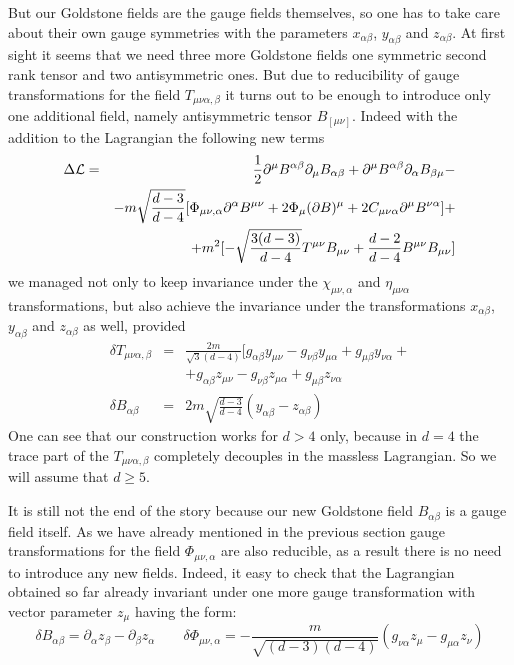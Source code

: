 \documentclass[a4paper,12pt]{article}
\begin{document}
But our Goldstone fields are the gauge fields themselves, so one has to
take care about their own gauge symmetries with the parameters
$x_{\alpha\beta}$, $y_{\alpha\beta}$ and $z_{\alpha\beta}$. At first
sight it seems that we need three more Goldstone fields one symmetric
second rank tensor and two antisymmetric ones. But due to reducibility
of gauge transformations for the field $T_{\mu\nu\alpha,\beta}$ it turns
out to be enough to introduce only one additional field, namely
antisymmetric tensor $B_{[\mu\nu]}$. Indeed with the addition to the
Lagrangian the following new terms
\begin{eqnarray}
\Delta {\cal L} &=& \frac{1}{2} \partial^\mu B^{\alpha\beta} \partial_\mu
B_{\alpha\beta} + \partial^\mu B^{\alpha\beta} \partial_\alpha B_{\beta\mu}
- \nonumber \\
 && - m \sqrt{\frac{d-3}{d-4}} [ \Phi_{\mu\nu,\alpha} \partial^\alpha
 B^{\mu\nu} + 2 \Phi_\mu (\partial B)^\mu + 2 C_{\mu\nu\alpha}
 \partial^\mu B^{\nu\alpha} ] + \nonumber \\
 && + m^2 [ - \sqrt{\frac{3(d-3)}{d-4}} T^{\mu\nu} B_{\mu\nu} +
 \frac{d-2}{d-4} B^{\mu\nu} B_{\mu\nu} ]
\end{eqnarray}
we managed not only to keep invariance under the $\chi_{\mu\nu,\alpha}$
and $\eta_{\mu\nu\alpha}$ transformations, but also achieve the invariance
under the transformations $x_{\alpha\beta}$, $y_{\alpha\beta}$ and
$z_{\alpha\beta}$ as well, provided
\begin{eqnarray}
\delta T_{\mu\nu\alpha,\beta} &=& \frac{2m}{\sqrt{3}(d-4)} [ g_{\alpha\beta}
y_{\mu\nu} - g_{\nu\beta} y_{\mu\alpha} + g_{\mu\beta} y_{\nu\alpha}
+ \nonumber \\
 && + g_{\alpha\beta} z_{\mu\nu} - g_{\nu\beta} z_{\mu\alpha} +
g_{\mu\beta} z_{\nu\alpha} \\
\delta B_{\alpha\beta} &=& 2 m \sqrt{\frac{d-3}{d-4}} (y_{\alpha\beta} -
z_{\alpha\beta}) \nonumber
\end{eqnarray}
One can see that our construction works for $d > 4$ only, because
in $d=4$ the trace part of the $T_{\mu\nu\alpha,\beta}$ completely
decouples in the massless Lagrangian. So we will assume that $d \ge 5$.

It is still not the end of the story because our new Goldstone field
$B_{\alpha\beta}$ is a gauge field itself. As we have already mentioned
in the previous section gauge transformations for the field
$\Phi_{\mu\nu,\alpha}$ are also reducible, as a result there is no need
to introduce any new fields. Indeed, it easy to check that the Lagrangian
obtained so far already invariant under one more gauge transformation
with vector parameter $z_\mu$ having the form:
\begin{equation}
\delta B_{\alpha\beta} = \partial_\alpha z_\beta - \partial_\beta z_\alpha
\qquad \delta \Phi_{\mu\nu,\alpha} = - \frac{m}{\sqrt{(d-3)(d-4)}}
(g_{\nu\alpha} z_\mu - g_{\mu\alpha} z_\nu)
\end{equation}
\end{document}
